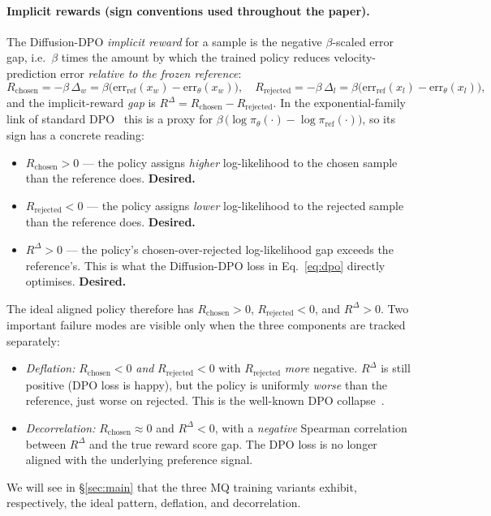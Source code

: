 \documentclass{article}
\begin{document}
\paragraph{Implicit rewards (sign conventions used throughout the paper).}
The Diffusion-DPO \emph{implicit reward} for a sample is the negative $\beta$-scaled error gap, i.e.\ $\beta$ times the amount by which the trained policy reduces velocity-prediction error \emph{relative to the frozen reference}:
\begin{equation}
R_{\text{chosen}} = -\beta\, \Delta_w = \beta\big(\text{err}_{\text{ref}}(x_w) - \text{err}_\theta(x_w)\big),
\quad
R_{\text{rejected}} = -\beta\, \Delta_l = \beta\big(\text{err}_{\text{ref}}(x_l) - \text{err}_\theta(x_l)\big),
\end{equation}
and the implicit-reward \emph{gap} is $R^{\Delta} = R_{\text{chosen}} - R_{\text{rejected}}$.  In the exponential-family link of standard DPO~\cite{rafailov2023dpo} this is a proxy for $\beta\,\big(\log\pi_\theta(\cdot) - \log\pi_{\text{ref}}(\cdot)\big)$, so its sign has a concrete reading:
\begin{itemize}
\item $R_{\text{chosen}} > 0$ --- the policy assigns \emph{higher} log-likelihood to the chosen sample than the reference does. \textbf{Desired.}
\item $R_{\text{rejected}} < 0$ --- the policy assigns \emph{lower} log-likelihood to the rejected sample than the reference does. \textbf{Desired.}
\item $R^{\Delta} > 0$ --- the policy's chosen-over-rejected log-likelihood gap exceeds the reference's. This is what the Diffusion-DPO loss in Eq.~\ref{eq:dpo} directly optimises. \textbf{Desired.}
\end{itemize}
The ideal aligned policy therefore has $R_{\text{chosen}} > 0$, $R_{\text{rejected}} < 0$, and $R^{\Delta} > 0$.  Two important failure modes are visible only when the three components are tracked separately:
\begin{itemize}
\item \emph{Deflation:} $R_{\text{chosen}} < 0$ \emph{and} $R_{\text{rejected}} < 0$ with $R_{\text{rejected}}$ \emph{more} negative.  $R^{\Delta}$ is still positive (DPO loss is happy), but the policy is uniformly \emph{worse} than the reference, just worse on rejected.  This is the well-known DPO collapse~\cite{pal2024deflate}.
\item \emph{Decorrelation:} $R_{\text{chosen}} \approx 0$ and $R^{\Delta} < 0$, with a \emph{negative} Spearman correlation between $R^{\Delta}$ and the true reward score gap.  The DPO loss is no longer aligned with the underlying preference signal.
\end{itemize}
We will see in \S\ref{sec:main} that the three MQ training variants exhibit, respectively, the ideal pattern, deflation, and decorrelation.
\end{document}

